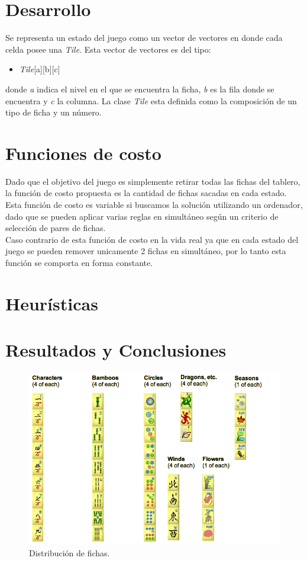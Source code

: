 \documentclass{sig-alternate}
\begin{document}
\section*{Desarrollo}

	Se representa un estado del juego como un vector de vectores en donde cada celda posee una \textit{Tile}. Esta vector de vectores es del tipo:
	\begin{itemize}
		\item \textit{Tile}[a][b][c]
	\end{itemize}
	donde \textit{a} indica el nivel en el que se encuentra la ficha, \textit{b} es la fila donde se encuentra y \textit{c} la columna. La clase \textit{Tile} esta definida como la composici\'on de un tipo de ficha y un n\'umero.
	
\section*{Funciones de costo}

	Dado que el objetivo del juego es simplemente retirar todas las fichas del tablero, la funci\'on de costo propuesta es la cantidad de fichas sacadas en cada estado. \\
	Esta funci\'on de costo es variable si buscamos la soluci\'on utilizando un ordenador, dado que se pueden aplicar varias reglas en simult\'aneo seg\'un un criterio de selecci\'on de pares de fichas. \\
	Caso contrario de esta funci\'on de costo en la vida real ya que en cada estado del juego se pueden remover unicamente 2 fichas en simult\'aneo, por lo tanto esta funci\'on se comporta en forma constante.

\section*{Heur\'isticas}



\section*{Resultados y Conclusiones}	

\onecolumn
\begin{figure}[h!]
  \begin{center}
  	\includegraphics[scale=0.5]{images/tiles.png}
  \end{center}
  \caption{Distribuci\'on de fichas.}
  \label{fig:tiles}
\end{figure}
\end{document}
